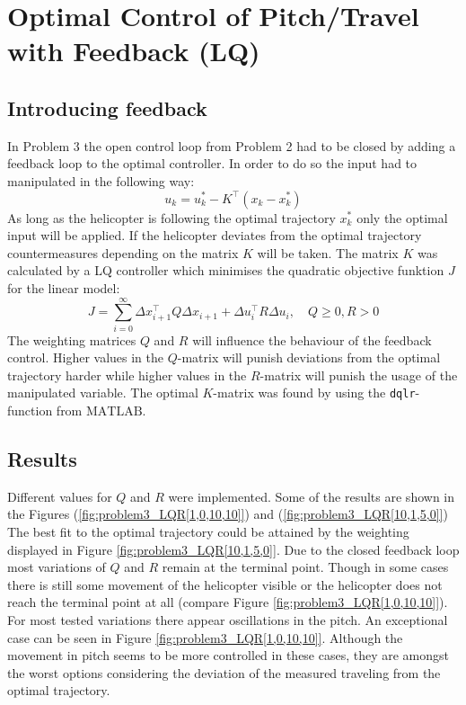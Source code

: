 \section{Optimal Control of Pitch/Travel with Feedback (LQ)}\label{sec:prob3}

\subsection{Introducing feedback}\label{sec:prob31}
In Problem 3 the open control loop from Problem 2 had to be closed by adding a feedback loop to the optimal controller. In order to do so the input had to manipulated in the following way:
\begin{equation}
	u_k=u_k^*-K^\top(x_k-x_k^*)
\end{equation}
As long as the helicopter is following the optimal trajectory $x_k^*$ only the optimal input will be applied. If the helicopter deviates from the optimal trajectory countermeasures depending on the matrix $K$ will be taken. The matrix $K$ was calculated by a LQ controller which minimises the quadratic objective funktion $J$ for the linear model:
\begin{equation}
	J=\displaystyle\sum_{i=0}^{\infty} \Delta x_{i+1}^\top Q \Delta x_{i+1} + \Delta u_i^\top R \Delta u_i, \quad Q \geq 0, R >0
\end{equation}
The weighting matrices $Q$ and $R$ will influence the behaviour of the feedback control. Higher values in the $Q$-matrix will punish deviations from the optimal trajectory harder while higher values in the $R$-matrix will punish the usage of the manipulated variable. The optimal $K$-matrix was found by using the \texttt{dqlr}-function from $\mathrm{MATLAB}$. 
\subsection{Results}\label{sec:prob32}
Different values for $Q$ and $R$ were implemented. Some of the results are shown in the Figures (\ref{fig:problem3_LQR[1,0,10,10]}) and (\ref{fig:problem3_LQR[10,1,5,0]}) \\
The best fit to the optimal trajectory could be attained by the weighting displayed in Figure \ref{fig:problem3_LQR[10,1,5,0]}. Due to the closed feedback loop most variations of $Q$ and $R$ remain at the terminal point. Though in some cases there is still some movement of the helicopter visible or the helicopter does not reach the terminal point at all (compare Figure \ref{fig:problem3_LQR[1,0,10,10]}). For most tested variations there appear oscillations in the pitch. An exceptional case can be seen in Figure \ref{fig:problem3_LQR[1,0,10,10]}. Although the movement in pitch seems to be more controlled in these cases, they are amongst the worst options considering the deviation of the measured traveling from the optimal trajectory.

